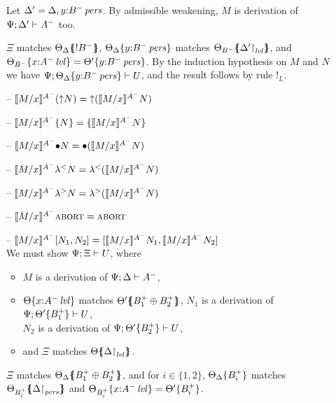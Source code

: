 \begin{itemize}
  Let $\Delta' = \mkconj{\Delta}{y{:}\ispers{B^-}}$.
  By admissible weakening, $M$ is derivation of $\foc{\Psi}{\Delta'}{A^-}$ too.

  $\Xi$ matches $\frameoff{\Theta_{\Delta}}{{!}B^-}$,
  $\tackon{\Theta_{\Delta}}{y{:}\ispers{B^-}}$ matches 
  $\frameoff{\Theta_{B^-}}{\restrictto{\Delta'}{\mlvl}}$,
  and 
  $\tackon{\Theta_{B^-}}{x{:}\islvl{A^-}} = \tackon{\Theta'}{y{:}\ispers{B^-}}$.
  By the induction hypothesis on $M$ and $N$ we have
  $\foc{\Psi}{\tackon{\Theta_{\Delta}}{y{:}\ispers{B^-}}}{U}$, and the result
  follows by rule ${!}_L$.

  \smallskip

\item[--] $\rsubsta{M}{x}{(\tupr{N})}{A^-} 
           = \tupr{(\rsubsta{M}{x}{N}{A^-})}$
\item[--] $\rsubsta{M}{x}{\tlaxr{N}}{A^-} 
           = \tlaxr{\rsubsta{M}{x}{N}{A^-}}$

\item[--] $\rsubsta{M}{x}{\tfusel{N}}{A^-} 
           = \tfusel{(\rsubsta{M}{x}{N}{A^-})}$
\item[--] $\rsubsta{M}{x}{\tlaml{N}}{A^-} 
           = \tlaml{(\rsubsta{M}{x}{N}{A^-})}$
\item[--] $\rsubsta{M}{x}{\tlamr{N}}{A^-} 
           = \tlamr{(\rsubsta{M}{x}{N}{A^-})}$
\item[--] $\rsubsta{M}{x}{\tabort}{A^-} 
           = \tabort$
\item[--] $\rsubsta{M}{x}{\toplusl{N_1}{N_2}}{A^-} 
           = \toplusl{\rsubsta{M}{x}{N_1}{A^-}}{\rsubsta{M}{x}{N_2}{A^-}}$
  \smallskip\\
  We must show $\foc{\Psi}{\Xi}{U}$, where 
  \begin{itemize}
  \item $M$ is a derivation of $\foc{\Psi}{\Delta}{A^-}$, 
  \item $\tackon{\Theta}{x{:}\islvl{A^-}}$ matches 
     $\frameoff{\Theta'}{B_1^+ \oplus B_2^+}$, $N_1$ is a derivation of 
     $\foc{\Psi}{\tackon{\Theta'}{B_1^+}}{U}$,\\
     $N_2$ is a derivation of $\foc{\Psi}{\tackon{\Theta'}{B_2^+}}{U}$,
  \item and $\Xi$ matches $\frameoff{\Theta}{\restrictto{\Delta}{\mlvl}}$.
  \end{itemize}

  $\Xi$ matches $\frameoff{\Theta_{\Delta}}{B_1^+ \oplus B_2^+}$,
  and for $i \in \{1,2\}$,
  $\tackon{\Theta_{\Delta}}{B_i^+}$ matches
  $\frameoff{\Theta_{B_i^+}}{\restrictto{\Delta}{\mpers}}$ 
  and
  $\tackon{\Theta_{B_i^+}}{x{:}\islvl{A^-}} =
   \tackon{\Theta'}{B_i^+}$.


\end{itemize}
